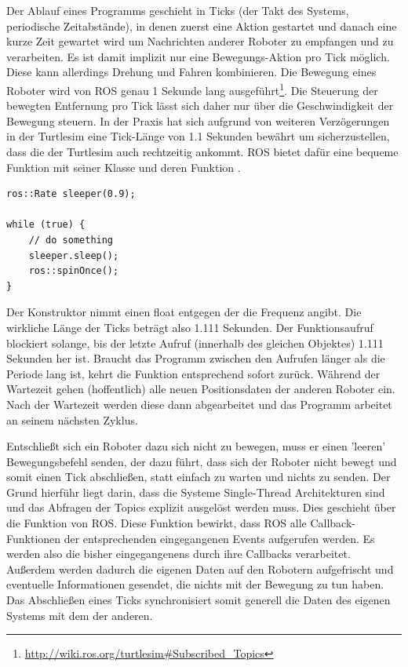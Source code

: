 Der Ablauf eines Programms geschieht in Ticks (der Takt des Systems, periodische Zeitabstände), in denen zuerst eine Aktion gestartet und danach eine kurze Zeit gewartet wird um Nachrichten anderer Roboter zu empfangen und zu verarbeiten. Es ist damit implizit nur eine Bewegungs-Aktion pro Tick möglich. Diese kann allerdings Drehung und Fahren kombinieren.
Die Bewegung eines Roboter wird von ROS genau 1 Sekunde lang ausgeführt\footnote{\url{http://wiki.ros.org/turtlesim\#Subscribed_Topics}}. Die Steuerung der bewegten Entfernung pro Tick lässt sich daher nur über die Geschwindigkeit der Bewegung steuern. In der Praxis hat sich aufgrund von weiteren Verzögerungen in der Turtlesim eine Tick-Länge von 1.1 Sekunden bewährt um sicherzustellen, dass die  der Turtlesim auch rechtzeitig ankommt. ROS bietet dafür eine bequeme Funktion mit seiner Klasse  und deren Funktion .

\begin{lstlisting}[style=cpp, title=Ticks abschließen mit ROS Funktionen]
ros::Rate sleeper(0.9);
        
while (true) {
	// do something
	sleeper.sleep();
	ros::spinOnce();
}
\end{lstlisting}

Der Konstruktor nimmt einen float entgegen der die Frequenz angibt. Die wirkliche Länge der Ticks beträgt also 1.111 Sekunden. Der Funktionsaufruf  blockiert solange, bis der letzte Aufruf (innerhalb des gleichen Objektes) 1.111 Sekunden her ist. Braucht das Programm zwischen den Aufrufen länger als die Periode lang ist, kehrt die Funktion entsprechend sofort zurück.
Während der Wartezeit gehen (hoffentlich) alle neuen Positionsdaten der anderen Roboter ein. Nach der Wartezeit werden diese dann abgearbeitet und das Programm arbeitet an seinem nächsten Zyklus.

Entschließt sich ein Roboter dazu sich nicht zu bewegen, muss er einen 'leeren' Bewegungsbefehl senden, der dazu führt, dass sich der Roboter nicht bewegt und somit einen Tick abschließen, statt einfach zu warten und nichts zu senden. Der Grund hierführ liegt darin, dass die Systeme Single-Thread Architekturen sind und das Abfragen der Topics explizit ausgelöst werden muss. Dies geschieht über die Funktion  von ROS. Diese Funktion bewirkt, dass ROS alle Callback-Funktionen der entsprechenden eingegangenen Events aufgerufen werden. Es werden also die bisher eingegangenens durch ihre Callbacks verarbeitet. Außerdem werden dadurch die eigenen Daten auf den Robotern aufgefrischt und eventuelle Informationen gesendet, die nichts mit der Bewegung zu tun haben. Das Abschließen eines Ticks synchronisiert somit generell die Daten des eigenen Systems mit dem der anderen.

